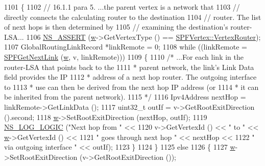 \begin{DoxyCode}
1101         \{
1102 \textcolor{comment}{// 16.1.1 para 5. ...the parent vertex is a network that}
1103 \textcolor{comment}{// directly connects the calculating router to the destination}
1104 \textcolor{comment}{// router.  The list of next hops is then determined by}
1105 \textcolor{comment}{// examining the destination's router-LSA...}
1106           \hyperlink{assert_8h_a6dccdb0de9b252f60088ce281c49d052}{NS\_ASSERT} (\hyperlink{lte_2model_2fading-traces_2fading__trace__generator_8m_afd61ec66f9d7b807eece6eb12c781844}{w}->GetVertexType () == \hyperlink{classns3_1_1SPFVertex_a20f8a4cfc99a1b7ecd10a23151b93afda340822983a2833fff14de88ea20a3f31}{SPFVertex::VertexRouter});
1107           GlobalRoutingLinkRecord *linkRemote = 0;
1108           \textcolor{keywordflow}{while} ((linkRemote = \hyperlink{classns3_1_1GlobalRouteManagerImpl_a4c868c90e06e063ac2eb60cfe93c2c84}{SPFGetNextLink} (\hyperlink{lte_2model_2fading-traces_2fading__trace__generator_8m_afd61ec66f9d7b807eece6eb12c781844}{w}, v, linkRemote)))
1109             \{
1110 \textcolor{comment}{/* ...For each link in the router-LSA that points back to the}
1111 \textcolor{comment}{ * parent network, the link's Link Data field provides the IP}
1112 \textcolor{comment}{ * address of a next hop router.  The outgoing interface to}
1113 \textcolor{comment}{ * use can then be derived from the next hop IP address (or }
1114 \textcolor{comment}{ * it can be inherited from the parent network).}
1115 \textcolor{comment}{ */}
1116               Ipv4Address nextHop = linkRemote->GetLinkData ();
1117               uint32\_t outIf = v->GetRootExitDirection ().second;
1118               \hyperlink{lte_2model_2fading-traces_2fading__trace__generator_8m_afd61ec66f9d7b807eece6eb12c781844}{w}->SetRootExitDirection (nextHop, outIf);
1119               \hyperlink{group__logging_ga88acd260151caf2db9c0fc84997f45ce}{NS\_LOG\_LOGIC} (\textcolor{stringliteral}{"Next hop from "} <<
1120                             v->GetVertexId () << \textcolor{stringliteral}{" to "} << \hyperlink{lte_2model_2fading-traces_2fading__trace__generator_8m_afd61ec66f9d7b807eece6eb12c781844}{w}->GetVertexId () <<
1121                             \textcolor{stringliteral}{" goes through next hop "} << nextHop <<
1122                             \textcolor{stringliteral}{" via outgoing interface "} << outIf);
1123             \}
1124         \}
1125       \textcolor{keywordflow}{else} 
1126         \{
1127           \hyperlink{lte_2model_2fading-traces_2fading__trace__generator_8m_afd61ec66f9d7b807eece6eb12c781844}{w}->SetRootExitDirection (v->GetRootExitDirection ());

\end{DoxyCode}

